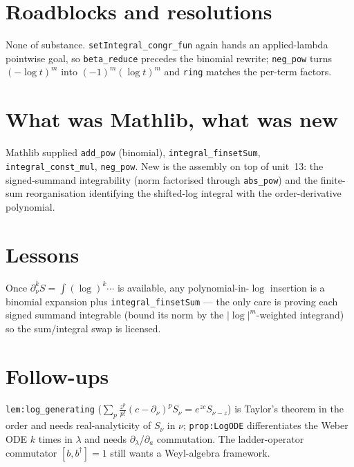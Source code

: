 \documentclass[11pt]{article}
\begin{document}
\section{Roadblocks and resolutions}
None of substance. \texttt{setIntegral\_congr\_fun} again hands an applied-lambda pointwise goal, so
\texttt{beta\_reduce} precedes the binomial rewrite; \texttt{neg\_pow} turns $(-\log t)^m$ into
$(-1)^m(\log t)^m$ and \texttt{ring} matches the per-term factors.

\section{What was Mathlib, what was new}
Mathlib supplied \texttt{add\_pow} (binomial), \texttt{integral\_finsetSum}, \texttt{integral\_const\_mul},
\texttt{neg\_pow}. New is the assembly on top of unit~13: the signed-summand integrability (norm
factorised through \texttt{abs\_pow}) and the finite-sum reorganisation identifying the shifted-log
integral with the order-derivative polynomial.

\section{Lessons}
Once $\partial_\nu^k S=\int(\log)^k\cdots$ is available, any polynomial-in-$\log$ insertion is a
binomial expansion plus \texttt{integral\_finsetSum} --- the only care is proving each signed summand
integrable (bound its norm by the $|\log|^m$-weighted integrand) so the sum/integral swap is licensed.

\section{Follow-ups}
\texttt{lem:log\_generating} ($\sum_p\frac{z^p}{p!}(c-\partial_\nu)^p S_\nu=e^{zc}S_{\nu-z}$) is Taylor's
theorem in the order and needs real-analyticity of $S_\nu$ in $\nu$; \texttt{prop:LogODE} differentiates
the Weber ODE $k$ times in $\lambda$ and needs $\partial_\lambda$/$\partial_a$ commutation. The
ladder-operator commutator $[b,b^\dagger]=1$ still wants a Weyl-algebra framework.
\end{document}
